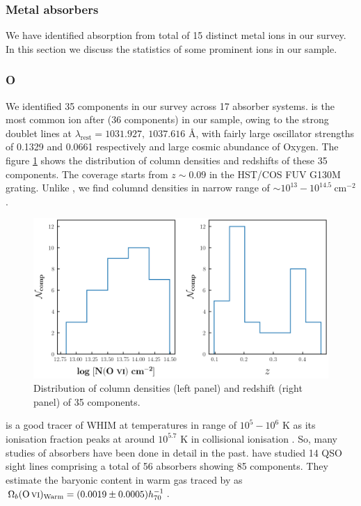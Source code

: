 \subsubsection{Metal absorbers}

We have identified absorption from total of 15 distinct metal ions in our survey. In this section we discuss the statistics of some prominent ions in our sample.

\subsubsection*{O \hspace*{-0.5mm}{\footnotesize VI}}

We identified 35  components in our survey across 17 absorber systems.  is the most common ion after  (36 components) in our sample, owing to the strong doublet lines at $\lambda_\text{rest}=1031.927, \ 1037.616$  \AA, with fairly large oscillator strengths of 0.1329 and 0.0661 respectively and large cosmic abundance of Oxygen. The figure \ref{fig:OVI_distribution} shows the distribution of column densities and redshifts of these 35 components. The  coverage starts from $z \sim 0.09$ in the HST/COS FUV G130M grating. Unlike , we find  columnd densities in narrow range of $\sim 10^{13} - 10^{14.5} \ \text{cm}^{-2}$. 

\begin{figure}
    \centering
    \includegraphics[width=\linewidth]{Figures/OVI_distribution_survey.png}
    \caption{Distribution of column densities (left panel) and redshift (right panel) of 35  components.}
    \label{fig:OVI_distribution}
\end{figure}

 is a good tracer of WHIM at temperatures in range of $10^5 - 10^6$ K as its ionisation fraction peaks at around $10^{5.7}$ K in collisional ionisation \citep{Gnat-Sternberg-2007}. So, many studies of  absorbers have been done in detail in the past. \citet{savage-2014} have studied 14 QSO sight lines comprising a total of 56  absorbers showing 85  components. They estimate the baryonic content in warm gas traced by  as $\Omega_b(\ion{O}{vi})_\text{Warm}= (0.0019 \pm 0.0005) h^{-1}_{70}$.

